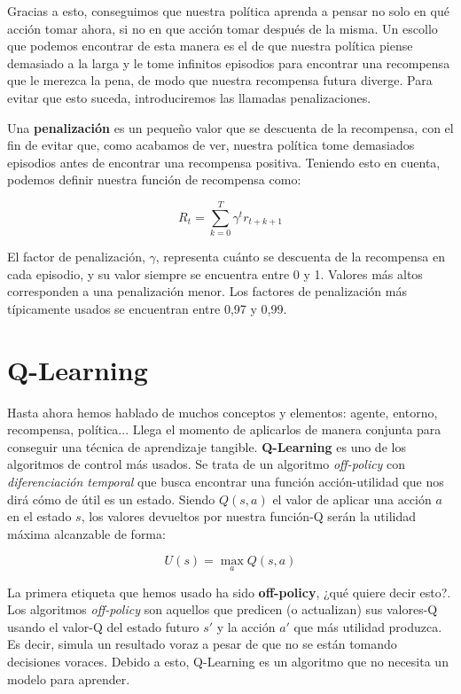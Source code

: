 Gracias a esto, conseguimos que nuestra política aprenda a pensar no solo en qué acción tomar ahora, si no en que acción tomar después de la misma. Un escollo que podemos encontrar de esta manera es el de que nuestra política piense demasiado a la larga y le tome infinitos episodios para encontrar una recompensa que le merezca la pena, de modo que nuestra recompensa futura diverge. Para evitar que esto suceda, introduciremos las llamadas penalizaciones.

Una \textbf{penalización} es un pequeño valor que se descuenta de la recompensa, con el fin de evitar que, como acabamos de ver, nuestra política tome demasiados episodios antes de encontrar una recompensa positiva. Teniendo esto en cuenta, podemos definir nuestra función de recompensa como:

\begin{equation}
    R_{t} = \sum^{T}_{k = 0} \gamma^{t}r_{t + k + 1}
\end{equation}

El factor de penalización, \( \gamma \), representa cuánto se descuenta de la recompensa en cada episodio, y su valor siempre se encuentra entre 0 y 1. Valores más altos corresponden a una penalización menor. Los factores de penalización más típicamente usados se encuentran entre 0,97 y 0,99.


\section{Q-Learning}
Hasta ahora hemos hablado de muchos conceptos y elementos: agente, entorno, recompensa, política... Llega el momento de aplicarlos de manera conjunta para conseguir una técnica de aprendizaje tangible. \textbf{Q-Learning} es uno de los algoritmos de control más usados. Se trata de un algoritmo \textit{off-policy} con \textit{diferenciación temporal} que busca encontrar una función acción-utilidad que nos dirá cómo de útil es un estado. Siendo $Q(s, a)$ el valor de aplicar una acción $a$ en el estado $s$, los valores devueltos por nuestra función-Q serán la utilidad máxima alcanzable de forma:

\begin{equation}
    U(s) = \max_{a}Q(s, a)
\end{equation}

La primera etiqueta que hemos usado ha sido \textbf{off-policy}, ¿qué quiere decir esto?. Los algoritmos \textit{off-policy} son aquellos que predicen (o actualizan) sus valores-Q usando el valor-Q del estado futuro $s'$ y la acción $a'$ que más utilidad produzca. Es decir, simula un resultado voraz a pesar de que no se están tomando decisiones voraces. Debido a esto, Q-Learning es un algoritmo que no necesita un modelo para aprender.

